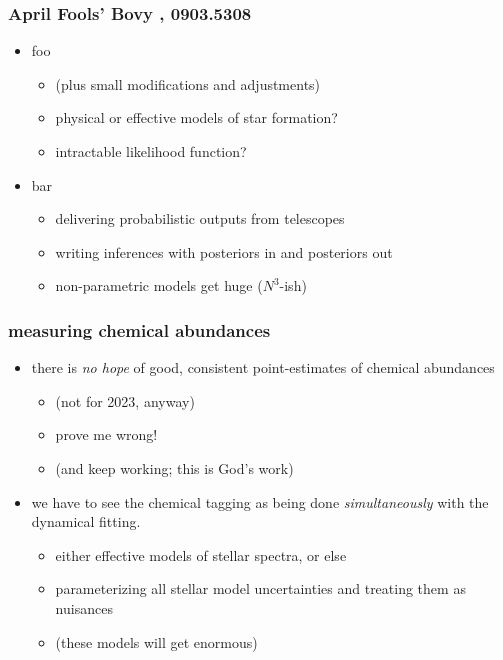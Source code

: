 \documentclass[pdftex]{beamer}
\begin{document}
\begin{frame}
  \frametitle{April Fools' {\footnotesize Bovy \etal, 0903.5308}}
  \begin{itemize}
  \item foo
    \begin{itemize}
    \item (plus small modifications and adjustments)
    \item physical or effective models of star formation?
    \item intractable likelihood function?
    \end{itemize}
  \item bar
    \begin{itemize}
    \item delivering probabilistic outputs from telescopes
    \item writing inferences with posteriors in and posteriors out
    \item non-parametric models get huge ($N^3$-ish)
    \end{itemize}
  \end{itemize}
\end{frame}

\begin{frame}
  \frametitle{measuring chemical abundances}
  \begin{itemize}
  \item there is \emph{no hope} of good, consistent point-estimates of
    chemical abundances
    \begin{itemize}
    \item (not for 2023, anyway)
    \item prove me wrong!
    \item (and keep working; this is God's work)
    \end{itemize}
  \item we have to see the chemical tagging as being done
    \emph{simultaneously} with the dynamical fitting.
    \begin{itemize}
    \item either effective models of stellar spectra, or else
    \item parameterizing all stellar model uncertainties and treating them as nuisances
    \item (these models will get enormous)
    \end{itemize}
  \end{itemize}
\end{frame}
\end{document}
